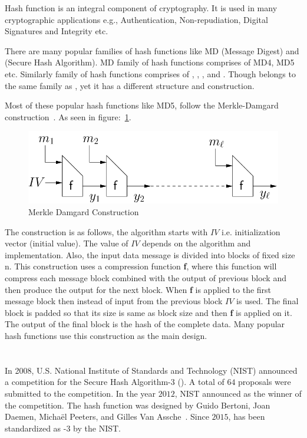Hash function is an integral component of cryptography. It is used in many cryptographic applications e.g., Authentication, Non-repudiation, Digital Signatures and Integrity etc.

There are many popular families of hash functions like MD (Message Digest) and \SHA(Secure Hash Algorithm). MD family of hash functions comprises of MD4, MD5 etc. Similarly \SHA family of hash functions comprises of , , , and .
Though  belongs to the same family as , yet it has a different structure and construction.

Most of these popular hash functions like MD5,  follow the Merkle-Damgard construction~\cite{merkle}. As seen in figure:~\ref{MDConstruction}.

\begin{figure}
    \centering
    \includegraphics[scale=0.5]{MDConstruction.png}
    \caption{Merkle Damgard Construction~\cite{MDamgard}}
    \label{MDConstruction}
\end{figure}


The construction is as follows, the algorithm starts with $IV$ i.e. initialization vector (initial value). The value of $IV$ depends on the algorithm and implementation. Also, the input data message is divided into blocks of fixed size n.
This construction uses a compression function \textbf{f}, where this function will compress each message block combined with the output of previous block and then produce the output for the next block. When \textbf{f} is applied to the first message block then instead of input from the previous block $IV$ is used. The final block is padded so that its size is same as block size and then \textbf{f} is applied on it. The output of the final block is the hash of the complete data. Many popular hash functions use this construction as the main design.

\section{\KECCAK{}}
In 2008, U.S. National Institute of Standards and Technology (NIST) announced a competition for the Secure Hash Algorithm-3 (). A total of $64$ proposals were submitted to the competition. In the year $2012$, NIST announced \KECCAK{} as the winner of the competition. The \KECCAK{} hash function was designed by Guido Bertoni, Joan Daemen, Micha\"{e}l Peeters, and Gilles Van Assche~\cite{bertoni2009keccak}. Since $2015$, \KECCAK{} has been standardized as \SHA-$3$ by the NIST.


